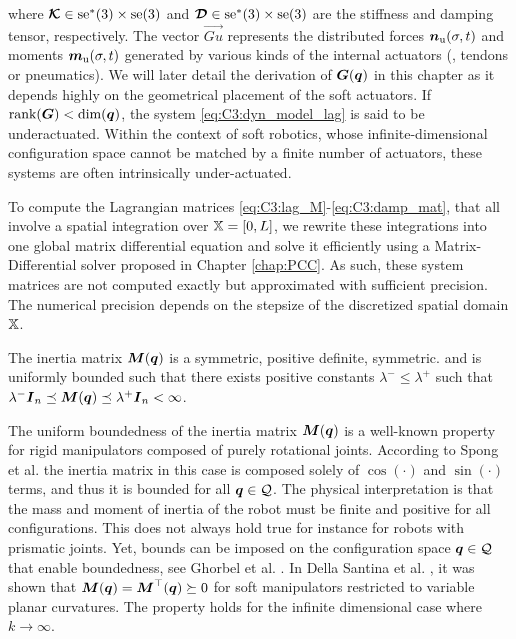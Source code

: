 %
where $\boldsymbol{\mathcal{K}} \in \textup{\textrm{se}}^*(3) \times \textup{\textrm{se}}(3)$ and $\boldsymbol{\mathcal{D}} \in  \textup{\textrm{se}}^*(3) \times \textup{\textrm{se}}(3)$ are the stiffness and damping tensor, respectively.
The vector $\vec{Gu}$ represents the distributed forces ${\boldsymbol{n}}_\textrm{u}(\sigma,t)$ and moments ${\boldsymbol{m}}_\textrm{u}(\sigma,t)$ generated by various kinds of the internal actuators (\eg, tendons or pneumatics). We will later detail the derivation of ${\boldsymbol{G}}({\boldsymbol{q}})$ in this chapter as it depends highly on the geometrical placement of the soft actuators. If $\textnormal{rank}({\boldsymbol{G}}) < \text{dim}({\boldsymbol{q}})$, the system \eqref{eq:C3:dyn_model_lag} is said to be underactuated. Within the context of soft robotics, whose infinite-dimensional configuration space cannot be matched by a finite number of actuators, these systems are often intrinsically under-actuated. 

To compute the Lagrangian matrices \eqref{eq:C3:lag_M}-\eqref{eq:C3:damp_mat}, that all involve a spatial integration over $\mathbb{X} = [0,L]$, we rewrite these integrations into one global matrix differential equation and solve it efficiently using a Matrix-Differential solver proposed in Chapter \ref{chap:PCC}. As such, these system matrices are not computed exactly but approximated with sufficient precision. The numerical precision depends on the stepsize of the discretized spatial domain $\mathbb{X}$. 
\begin{asm}
\label{lem:C3:1}
The inertia matrix $\boldsymbol{M}(\boldsymbol{q})$ is a symmetric, positive definite, symmetric. and is uniformly bounded such that there exists positive constants $\lambda^{-} \le \lambda^{+}$ such that  $\lambda^{-} \boldsymbol{I}_{n} \preceq \boldsymbol{M}(\boldsymbol{q}) \preceq \lambda^{+} \boldsymbol{I}_{n} < \infty$.
\end{asm}

The uniform boundedness of the inertia matrix ${\boldsymbol{M}}({\boldsymbol{q}})$ is a well-known property for rigid manipulators composed of purely rotational joints. According to Spong et al. \cite{Spong2006} the inertia matrix in this case is composed solely of $\cos(\cdot)$ and $\sin(\cdot)$ terms, and thus it is bounded for all ${\boldsymbol{q}} \in \mathcal{Q}$. The physical interpretation is that the mass and moment of inertia of the robot must be finite and positive for all configurations. This does not always hold true for instance for robots with prismatic joints. Yet, bounds can be imposed on the configuration space ${\boldsymbol{q}} \in \mathcal{Q}$ that enable boundedness, see Ghorbel et al. \cite{Ghorbel1998Dec}. In Della Santina et al. \cite{DellaSantina2020a}, it was shown that ${\boldsymbol{M}}({\boldsymbol{q}}) = {\boldsymbol{M}}^\top({\boldsymbol{q}}) \succeq 0$ for soft manipulators restricted to variable planar curvatures. The property holds for the infinite dimensional case where $k \to \infty$. 

